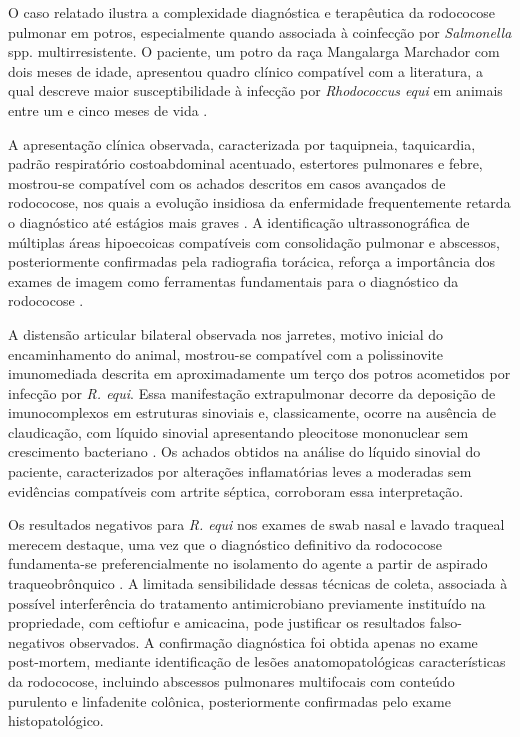 O caso relatado ilustra a complexidade diagnóstica e terapêutica da
rodococose pulmonar em potros, especialmente quando associada à
coinfecção por \textit{Salmonella} spp. multirresistente. O paciente, um
potro da raça Mangalarga Marchador com dois meses de idade, apresentou
quadro clínico compatível com a literatura, a qual descreve maior
susceptibilidade à infecção por \textit{Rhodococcus equi} em animais entre
um e cinco meses de vida \cite{Cohen2014, Lascola2024}.

A apresentação clínica observada, caracterizada por taquipneia,
taquicardia, padrão respiratório costoabdominal acentuado, estertores
pulmonares e febre, mostrou-se compatível com os achados descritos em
casos avançados de rodococose, nos quais a evolução insidiosa da
enfermidade frequentemente retarda o diagnóstico até estágios mais
graves \cite{Giguere2011, Sanz2023}. A identificação ultrassonográfica de
múltiplas áreas hipoecoicas compatíveis com consolidação pulmonar e
abscessos, posteriormente confirmadas pela radiografia torácica, reforça
a importância dos exames de imagem como ferramentas fundamentais para o
diagnóstico da rodococose \cite{Cohen2014, Muscatello2012}.

A distensão articular bilateral observada nos jarretes, motivo inicial
do encaminhamento do animal, mostrou-se compatível com a polissinovite
imunomediada descrita em aproximadamente um terço dos potros acometidos
por infecção por \textit{R. equi}. Essa manifestação extrapulmonar decorre
da deposição de imunocomplexos em estruturas sinoviais e, classicamente,
ocorre na ausência de claudicação, com líquido sinovial apresentando
pleocitose mononuclear sem crescimento bacteriano \cite{Giguere2011, Lascola2024}.
Os achados obtidos na análise do líquido sinovial do
paciente, caracterizados por alterações inflamatórias leves a moderadas
sem evidências compatíveis com artrite séptica, corroboram essa
interpretação.

Os resultados negativos para \textit{R. equi} nos exames de swab nasal e
lavado traqueal merecem destaque, uma vez que o diagnóstico definitivo
da rodococose fundamenta-se preferencialmente no isolamento do agente a
partir de aspirado traqueobrônquico \cite{Cohen2014}. A limitada
sensibilidade dessas técnicas de coleta, associada à possível
interferência do tratamento antimicrobiano previamente instituído na
propriedade, com ceftiofur e amicacina, pode justificar os resultados
falso-negativos observados. A confirmação diagnóstica foi obtida apenas
no exame post-mortem, mediante identificação de lesões
anatomopatológicas características da rodococose, incluindo abscessos
pulmonares multifocais com conteúdo purulento e linfadenite colônica,
posteriormente confirmadas pelo exame histopatológico.

